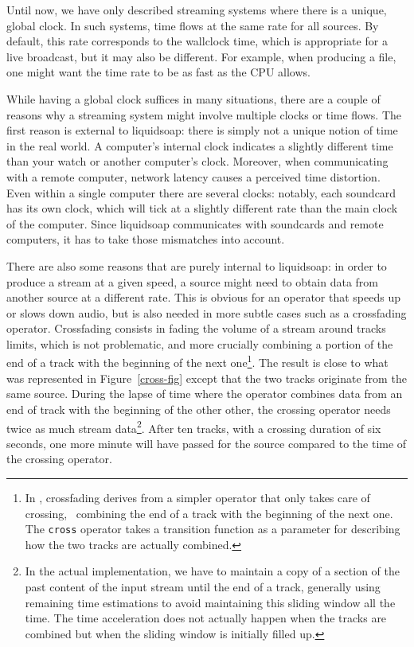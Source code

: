 
Until now, we have only described streaming systems where there is
a unique, global clock. In such systems, time flows at the same rate
for all sources.
By default, this rate corresponds to the wallclock time,
which is appropriate for a live broadcast,
but it may also be different.
For example, when producing a file, one might want the time rate
to be as fast as the CPU allows.

While having a global clock suffices in many situations,
there are a couple of reasons why a streaming system might involve multiple
clocks or time flows.
The first reason is external to liquidsoap: there is simply
not a unique notion of time in the real world.
A computer's internal clock indicates a slightly different time
than your watch or another computer's clock.
Moreover, when communicating with a remote computer, network
latency causes a perceived time distortion.
Even within a single computer there are several clocks: notably, each
soundcard has its own clock, which will tick at a slightly different
rate than the main clock of the computer.
Since liquidsoap communicates with soundcards and remote computers,
it has to take those mismatches into account.

There are also some reasons that are purely internal to liquidsoap:
in order to produce a stream at a given speed,
a source might need to obtain data from another source at
a different rate. This is obvious for an operator that speeds up or
slows down audio, but is also needed in more subtle cases
such as a crossfading operator.
Crossfading consists in fading the volume of a stream around tracks
limits, which is not problematic, and more crucially combining a portion
of the end of a track with the beginning of the next one\footnote{
  In \liquidsoap, crossfading derives from a simpler operator that
  only takes care of crossing, \ie\ combining the end of a track
  with the beginning of the next one. The \texttt{cross} operator
  takes a transition function as a parameter for describing how
  the two tracks are actually combined.
}.
The result is close to what was represented in Figure~\ref{cross-fig}
except that the two tracks originate from the same source.
During the lapse of time where the operator combines
data from an end of track with the beginning of the other other,
the crossing operator needs twice as much stream data\footnote{
  In the actual implementation, we have to
  maintain a copy of a section of the past content
  of the input stream until the end of a track,
  generally using remaining time estimations to avoid maintaining
  this sliding window all the time.
  The time acceleration does not actually happen
  when the tracks are combined but when the sliding window
  is initially filled up.
}.
After ten tracks,
with a crossing duration of six seconds, one more minute will have
passed for the source compared to the time of the crossing operator.

